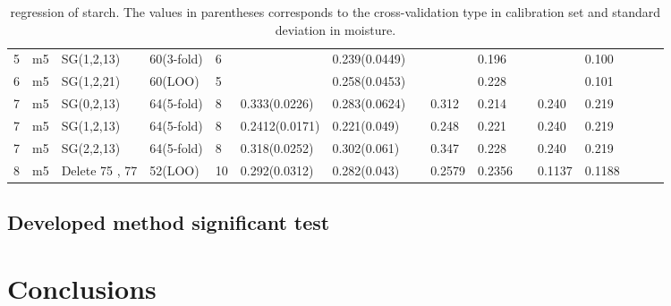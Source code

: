 \documentclass[a4paper,12pt,titlepage]{article} %
\numberwithin{equation}{section}  %
\begin{document}
\begin{landscape}
\begin{table}[]
\begin{tabular}{llllllllllllllll}
				5                    & m5                   & SG(1,2,13)           & 60(3-fold) & 6  &                & 0.239(0.0449) &   &        & 0.196  &   &        & 0.100          &         &    &               \\
				6                    & m5                   & SG(1,2,21)           & 60(LOO)    & 5  &                & 0.258(0.0453) &   &        & 0.228  &   &        & 0.101          &         &    &               \\
				7                    & m5                   & SG(0,2,13)           & 64(5-fold) & 8  & 0.333(0.0226)  & 0.283(0.0624) &   & 0.312  & 0.214  &   & 0.240  & 0.219          &         &    &               \\
				7                    & m5                   & SG(1,2,13)           & 64(5-fold) & 8  & 0.2412(0.0171) & 0.221(0.049)  &   & 0.248  & 0.221  &   & 0.240  & 0.219          &         &    &               \\
				7                    & m5                   & SG(2,2,13)           & 64(5-fold) & 8  & 0.318(0.0252)  & 0.302(0.061)  &   & 0.347  & 0.228  &   & 0.240  & 0.219          &         &    &               \\
				8                    & m5                   & Delete 75 , 77       & 52(LOO)    & 10 & 0.292(0.0312)  & 0.282(0.043)  &   & 0.2579 & 0.2356 &   & 0.1137 & 0.1188         &         &    &               
			\end{tabular}
			
			\caption{regression of starch. The values in parentheses corresponds to the cross-validation type in calibration set and standard deviation in moisture.}
			\label{tab:starch}
		\end{table}
	\end{landscape}
	
	
	
	\subsection{Developed method significant test}
	\label{sec: test}
	
	
	
	\section{Conclusions}
	\label{sec:conclution}
	
	
	
	
	
	
	
\end{document}
